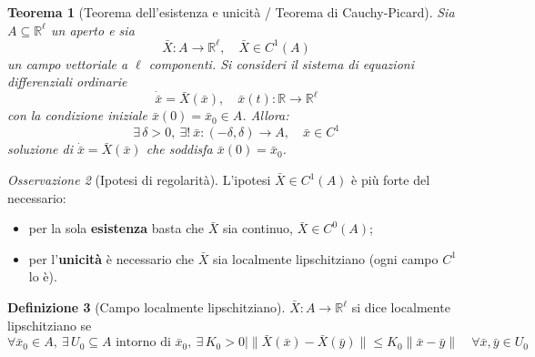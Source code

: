\documentclass[11pt, a4paper, openright]{book}
\theoremstyle{plain}
\newtheorem{teorema}{Teorema}[section]
\theoremstyle{definition}
\newtheorem{definizione}[teorema]{Definizione}
\theoremstyle{remark}
\newtheorem{osservazione}[teorema]{Osservazione}
\begin{document}
\begin{teorema}[Teorema dell'esistenza e unicità / Teorema di Cauchy-Picard]
    Sia $A \subseteq \mathbb{R}^\ell$ un aperto e sia
    \begin{equation}
        \bar{X} : A \longrightarrow \mathbb{R}^\ell, \quad \bar{X} \in C^1(A)
    \end{equation}
    un campo vettoriale a $\ell$ componenti. Si consideri il sistema di equazioni differenziali ordinarie
    \begin{equation}
        \dot{\bar{x}} = \bar{X}(\bar{x}), \quad \bar{x}(t) : \mathbb{R} \longrightarrow \mathbb{R}^\ell
    \end{equation}
    con la condizione iniziale $\bar{x}(0) = \bar{x}_0 \in A$. Allora:
    \begin{equation}
        \exists\, \delta > 0, \ \exists!\ \bar{x} : (-\delta, \delta) \longrightarrow A, \quad \bar{x} \in C^1
    \end{equation}
    soluzione di $\dot{\bar{x}} = \bar{X}(\bar{x})$ che soddisfa $\bar{x}(0) = \bar{x}_0$.
\end{teorema}

\begin{osservazione}[Ipotesi di regolarità]
    L'ipotesi $\bar{X} \in C^1(A)$ è più forte del necessario:
    \begin{itemize}
        \item per la sola \textbf{esistenza} basta che $\bar{X}$ sia continuo, $\bar{X} \in C^0(A)$;
        \item per l'\textbf{unicità} è necessario che $\bar{X}$ sia localmente lipschitziano (ogni campo $C^1$ lo è).
    \end{itemize}
\end{osservazione}

\begin{definizione}[Campo localmente lipschitziano]
    $\bar{X} : A \to \mathbb{R}^\ell$ si dice localmente lipschitziano se
    \begin{equation}
        \forall \bar{x}_0 \in A, \ \exists\, U_0 \subseteq A \text{ intorno di } \bar{x}_0, \ \exists\, K_0 > 0 \mid \|\bar{X}(\bar{x}) - \bar{X}(\bar{y})\| \leq K_0 \|\bar{x} - \bar{y}\| \quad \forall \bar{x}, \bar{y} \in U_0
    \end{equation}
\end{definizione}
\end{document}
